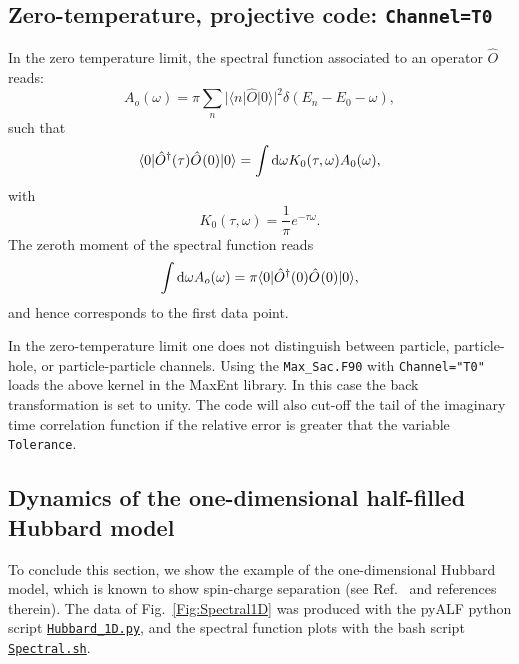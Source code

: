 \subsection{Zero-temperature, projective code:  \texttt{Channel=T0}}

 In the zero temperature limit,  the spectral function associated to an operator $\hat{O} $    reads:
 \begin{equation}
 	  A_o(\omega)    = \pi  \sum_{n}    | \langle n  | \hat{O} | 0 \rangle |^2 \delta( E_n - E_0 - \omega) ,
 \end{equation}
 such that 
 \begin{equation}
 	\langle 0 | \hat{O}^{\dagger}(\tau) \hat{O}^{}(0) | 0 \rangle =  \int \mathrm{d}\omega  K_0(\tau,\omega) A_0(\omega) ,
 \end{equation}
 with 
 \begin{equation}
 	K_0(\tau,\omega)  = \frac{1}{\pi}e^{-\tau \omega}.
 \end{equation}
 The zeroth moment of the spectral function reads
 \begin{equation}
  \int \mathrm{d} \omega A_o(\omega) = \pi \langle 0 | \hat{O}^{\dagger}(0) \hat{O}^{}(0) | 0 \rangle, 
 \end{equation}
 and hence corresponds to the first data point.
 
 In the zero-temperature limit one does not distinguish between  particle, particle-hole, or particle-particle channels.
 Using the \texttt{Max\_Sac.F90}  with \texttt{Channel="T0"} loads the above kernel in the MaxEnt library. In this case the back  transformation is set to unity. 
 The code will also cut-off the tail of the  imaginary time correlation function  if the relative error is greater that the variable \texttt{Tolerance}. 
 
 \subsection{Dynamics of the one-dimensional half-filled Hubbard model}

To conclude this section, we show the example of the one-dimensional Hubbard model, which is known to show spin-charge separation (see Ref.~\cite{Abendschein06}  and references therein).    The data of Fig.~\ref{Fig:Spectral1D}    was produced with the pyALF python script  \href{https://git.physik.uni-wuerzburg.de/ALF/ALF/-/blob/master/Documentation/Figures/MaxEnt/Hubbard_1D.py}{\texttt{Hubbard\_1D.py}}, and   the spectral function plots with the bash script \href{https://git.physik.uni-wuerzburg.de/ALF/ALF/-/blob/master/Documentation/Figures/MaxEnt/Spectral.sh}{\texttt{Spectral.sh}}. 

